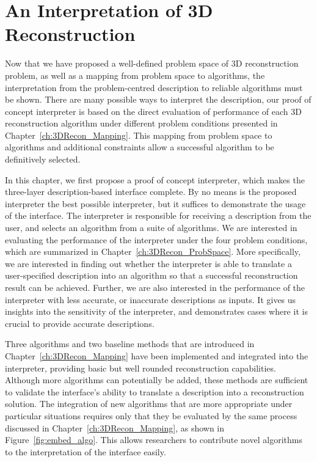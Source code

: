 
\chapter{An Interpretation of 3D Reconstruction}
\label{ch:3DRecon_Interp}
Now that we have proposed a well-defined problem space of 3D reconstruction problem, as well as a mapping from problem space to algorithms, the interpretation from the problem-centred description to reliable algorithms must be shown. There are many possible ways to interpret the description, our proof of concept interpreter is based on the direct evaluation of performance of each 3D reconstruction algorithm under different problem conditions presented in Chapter~\ref{ch:3DRecon_Mapping}. This mapping from problem space to algorithms and additional constraints allow a successful algorithm to be definitively selected.

In this chapter, we first propose a proof of concept interpreter, which makes the three-layer description-based interface complete. By no means is the proposed interpreter the best possible interpreter, but it suffices to demonstrate the usage of the interface. The interpreter is responsible for receiving a description from the user, and selects an algorithm from a suite of algorithms. We are interested in evaluating the performance of the interpreter under the four problem conditions, which are summarized in Chapter~\ref{ch:3DRecon_ProbSpace}. More specifically, we are interested in finding out whether the interpreter is able to translate a user-specified description into an algorithm so that a successful reconstruction result can be achieved. Further, we are also interested in the performance of the interpreter with less accurate, or inaccurate descriptions as inputs. It gives us insights into the sensitivity of the interpreter, and demonstrates cases where it is crucial to provide accurate descriptions.

Three algorithms and two baseline methods that are introduced in Chapter~\ref{ch:3DRecon_Mapping} have been implemented and integrated into the interpreter, providing basic but well rounded reconstruction capabilities. Although more algorithms can potentially be added, these methods are sufficient to validate the interface's ability to translate a description into a reconstruction solution. The integration of new algorithms that are more appropriate under particular situations requires only that they be evaluated by the same process discussed in Chapter~\ref{ch:3DRecon_Mapping}, as shown in Figure~\ref{fig:embed_algo}. This allows researchers to contribute novel algorithms to the interpretation of the interface easily.

